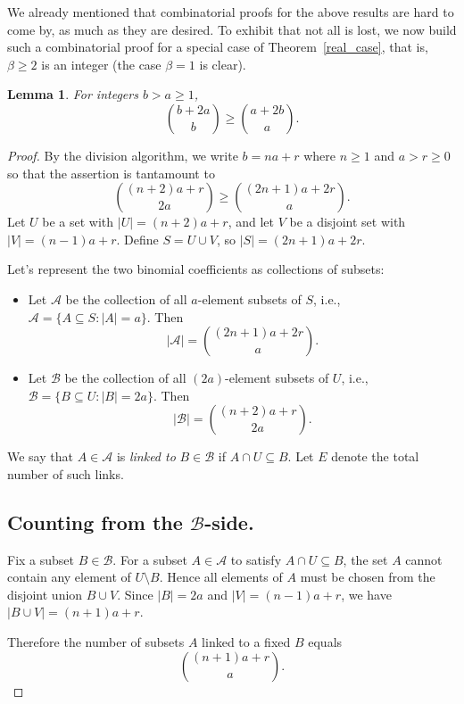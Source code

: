 \documentclass[11pt]{amsart}
\newtheorem{lemma}[theorem]{Lemma}
\begin{document}
We already mentioned that combinatorial proofs for the above results are hard to come by, as much as they are desired.
To exhibit that not all is lost, we now build such a combinatorial proof for a special case of Theorem~\ref{real_case},
that is, $\beta\geq2$ is an integer (the case $\beta=1$ is clear).

\begin{lemma} \label{lemma1}
For integers $b> a \ge 1$,
$$ \binom{b+2a}b \ge \binom{a+2b}{a}.$$
\end{lemma}

\begin{proof} By the division algorithm, we write $b=na+r$ where $n\geq1$ and $a>r\geq0$ so that the assertion is tantamount to
$$ \binom{(n+2)a+r}{2a} \ge \binom{(2n+1)a+2r}{a}.$$
 Let $U$ be a set with $|U| = (n+2)a+r$, and let $V$ be a disjoint set with $|V| = (n-1)a+r$. Define $S = U \cup V$, so $|S| = (2n+1)a+2r$. 

Let's represent the two binomial coefficients as collections of subsets:

\begin{itemize}
    \item Let $\mathcal{A}$ be the collection of all $a$-element subsets of $S$, i.e., $\mathcal{A} = \{ A \subseteq S : |A| = a \}$. Then
    $$
    |\mathcal{A}|=\binom{(2n+1)a+2r}{a}.
    $$

    \item Let $\mathcal{B}$ be the collection of all $(2a)$-element subsets of $U$, i.e., $\mathcal B = \{ B \subseteq U : |B| = 2a \}$. Then
    $$
    |\mathcal{B}|=\binom{(n+2)a+r}{2a}.
    $$
\end{itemize}
We say that $A\in\mathcal{A}$ is \emph{linked to} $B\in\mathcal{B}$ if $A\cap U \subseteq B$.
Let $E$ denote the total number of such links.

\subsection*{Counting from the $\mathcal{B}$-side.}

Fix a subset $B\in\mathcal{B}$. For a subset $A\in\mathcal{A}$ to satisfy $A\cap U\subseteq B$, the set $A$ cannot contain any element of $U\setminus B$. Hence all elements of $A$ must be chosen from the disjoint union $B\cup V$. Since $|B|=2a$ and $|V|=(n-1)a+r$, we have $|B\cup V|=(n+1)a+r$.

Therefore the number of subsets $A$ linked to a fixed $B$ equals
$$
\binom{(n+1)a+r}a.
$$


\end{proof}
\end{document}
